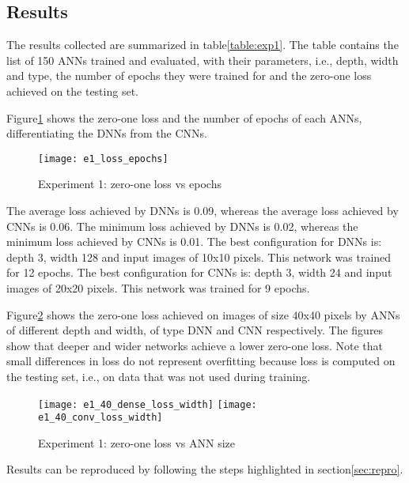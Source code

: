 \subsection{Results}
The results collected are summarized in table\ref{table:exp1}. The table contains the list of 150 ANNs trained and evaluated, with their parameters, i.e., depth, width and type, the number of epochs they were trained for and the zero-one loss achieved on the testing set.


Figure\ref{fig:e1_loss_epochs} shows the zero-one loss and the number of epochs of each ANNs, differentiating the DNNs from the CNNs.
\begin{figure}
\texttt{[image: e1\_loss\_epochs]}
\caption{Experiment 1: zero-one loss vs epochs}\label{fig:e1_loss_epochs}
\end{figure}
The average loss achieved by DNNs is 0.09, whereas the average loss achieved by CNNs is 0.06. The minimum loss achieved by DNNs is 0.02, whereas the minimum loss achieved by CNNs is 0.01. The best configuration for DNNs is: depth 3, width 128 and input images of 10x10 pixels. This network was trained for 12 epochs. The best configuration for CNNs is: depth 3, width 24 and input images of 20x20 pixels. This network was trained for 9 epochs.

Figure\ref{fig:e1_40_loss_width} shows the zero-one loss achieved on images of size 40x40 pixels by ANNs of different depth and width, of type DNN and CNN respectively. The figures show that deeper and wider networks achieve a lower zero-one loss. Note that small differences in loss do not represent overfitting because loss is computed on the testing set, i.e., on data that was not used during training.
\begin{figure}
\texttt{[image: e1\_40\_dense\_loss\_width]}
\texttt{[image: e1\_40\_conv\_loss\_width]}
\caption{Experiment 1: zero-one loss vs ANN size}\label{fig:e1_40_loss_width}
\end{figure}

Results can be reproduced by following the steps highlighted in section\ref{sec:repro}.
